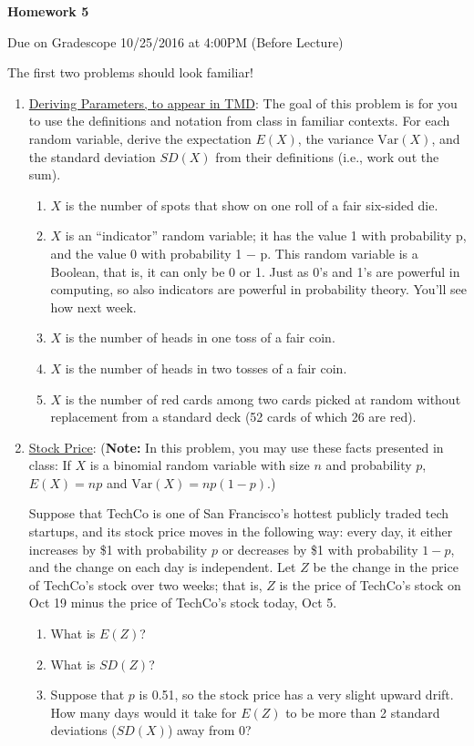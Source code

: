 \documentclass[11pt]{article}
\newcommand{\V}{\mathrm{Var}}
\begin{document}
\centerline{\textbf{Homework 5}}
\centerline{Due on Gradescope 10/25/2016 at 4:00PM (Before Lecture)}

The first two problems should look familiar!

\begin{enumerate}
\item \underline{Deriving Parameters, to appear in TMD}:
The goal of this problem is for you to use the definitions and notation from class in familiar
contexts. For each random variable, derive the expectation $E(X)$, the variance $\V(X)$, and the standard deviation $SD(X)$ from their definitions (i.e., work out the sum). 
\begin{enumerate}
\item $X$ is the number of spots that show on one roll of a fair six-sided die.
\item $X$ is an ``indicator'' random variable; it has the value 1 with probability p, and the value 0
with probability 1 − p. This random variable is a Boolean, that is, it can only be 0 or 1. Just as
0’s and 1’s are powerful in computing, so also indicators are powerful in probability theory. You’ll see how next week.
\item $X$ is the number of heads in one toss of a fair coin.
\item $X$ is the number of heads in two tosses of a fair coin.
\item $X$ is the number of red cards among two cards picked at random without replacement from
a standard deck (52 cards of which 26 are red).
\end{enumerate}

\item \underline{Stock Price}:
    ({\bf Note:} In this problem, you may use these facts presented in class: If $X$ is a binomial random variable with size $n$ and probability $p$, $E(X) = np$ and $\V(X) = np(1-p)$.)

Suppose that TechCo is one of San Francisco's hottest publicly traded tech startups, and its stock price moves in the following way: every day, it either increases by \$1 with probability $p$ or decreases by \$1 with probability $1-p$, and the change on each day is independent. Let $Z$ be the change in the price of TechCo's stock over two weeks; that is, $Z$ is the price of TechCo's stock on Oct 19 minus the price of TechCo's stock today, Oct 5.

\begin{enumerate}
    \item What is $E(Z)$?
    \item What is $SD(Z)$?
    \item Suppose that $p$ is 0.51, so the stock price has a very slight upward drift. How many days would it take for $E(Z)$ to be more than 2 standard deviations ($SD(X)$) away from 0?
\end{enumerate}


\end{enumerate}
\end{document}
